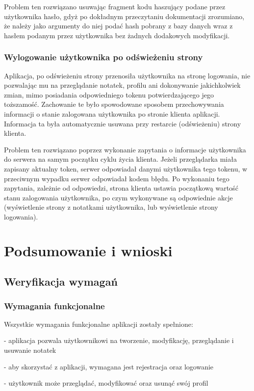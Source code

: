 \documentclass[a4paper,twoside,12pt]{book}
\begin{document}
Problem ten rozwiązano usuwając fragment kodu haszujący podane przez użytkownika
hasło, gdyż po dokładnym przeczytaniu dokumentacji zrozumiano, że należy jako
argumenty do niej podać hash pobrany z bazy danych wraz z hasłem podanym przez
użytkownika bez żadnych dodakowych modyfikacji.

\subsection{Wylogowanie użytkownika po odświeżeniu strony}
Aplikacja, po odświeżeniu strony przenosiła użytkownika na stronę logowania,
nie pozwalając mu na przeglądanie notatek, profilu ani dokonywanie jakichkolwiek
zmian, mimo posiadania odpowiedniego tokenu potwierdzającego jego toższamość.
Zachowanie te było spowodowane sposobem przechowywania informacji o stanie zalogowana
użytkownika po stronie klienta aplikacji. Informacja ta była automatycznie usuwana
przy restarcie (odświeżeniu) strony klienta.

Problem ten rozwiązano poprzez wykonanie zapytania o informacje użytkownika
do serwera na samym początku cyklu życia klienta. Jeżeli przeglądarka miała
zapisany aktualny token, serwer odpowiadał danymi użytkownika tego tokenu, 
w przeciwnym wypadku serwer odpowiadał kodem błędu. Po wykonaniu tego
zapytania, zależnie od odpowiedzi, strona klienta ustawia początkową
wartość stanu zalogowania użytkownika, po czym wykonywane są odpowiednie
akcje (wyświetlenie strony z notatkami użytkownika, lub wyświetlenie strony
logowania).


\chapter{Podsumowanie i wnioski}
\section{Weryfikacja wymagań}
\subsection{Wymagania funkcjonalne}

Wszystkie wymagania funkcjonalne aplikacji zostały spełnione:

- aplikacja pozwala użytkownikowi na tworzenie, modyfikację, przeglądanie i usuwanie notatek

- aby skorzystać z aplikacji, wymagana jest rejestracja oraz logowanie

- użytkownik może przeglądać, modyfikować oraz usunąć swój profil
\end{document}
